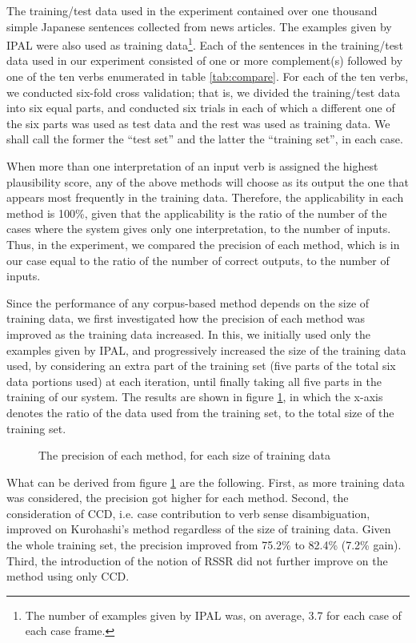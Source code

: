 The training/test data used in the experiment contained over one
thousand simple Japanese sentences collected from news articles. The
examples given by IPAL were also used as training data\footnote{The
  number of examples given by IPAL was, on average, 3.7 for each case
  of each case frame.}.  Each of the sentences in the training/test
data used in our experiment consisted of one or more complement(s)
followed by one of the ten verbs enumerated in table
\ref{tab:compare}. For each of the ten verbs, we conducted six-fold
cross validation; that is, we divided the training/test data into six
equal parts, and conducted six trials in each of which a different one
of the six parts was used as test data and the rest was used as
training data. We shall call the former the ``test set'' and the
latter the ``training set'', in each case.

When more than one interpretation of an input verb is assigned the
highest plausibility score, any of the above methods will choose as
its output the one that appears most frequently in the training data. 
Therefore, the applicability in each method is 100\%, given that the
applicability is the ratio of the number of the cases where the system
gives only one interpretation, to the number of inputs. Thus, in the
experiment, we compared the precision of each method, which is in our
case equal to the ratio of the number of correct outputs, to the
number of inputs.

Since the performance of any corpus-based method depends on the size
of training data, we first investigated how the precision of each
method was improved as the training data increased. In this, we
initially used only the examples given by IPAL, and progressively
increased the size of the training data used, by considering an extra
part of the training set (five parts of the total six data portions
used) at each iteration, until finally taking all five parts in the
training of our system.  The results are shown in figure
\ref{fig:plot}, in which the x-axis denotes the ratio of the data used
from the training set, to the total size of the training set.

\begin{figure}[htbp]
  \begin{center}
    \leavevmode {}
  \end{center}
  \caption{The precision of each method, for each size of training data}
  \label{fig:plot}
\end{figure}

What can be derived from figure \ref{fig:plot} are the following. 
First, as more training data was considered, the precision got higher
for each method. Second, the consideration of CCD, i.e. case
contribution to verb sense disambiguation, improved on Kurohashi's
method regardless of the size of training data. Given the whole
training set, the precision improved from 75.2\% to 82.4\% (7.2\%
gain).  Third, the introduction of the notion of RSSR did not further
improve on the method using only CCD.

